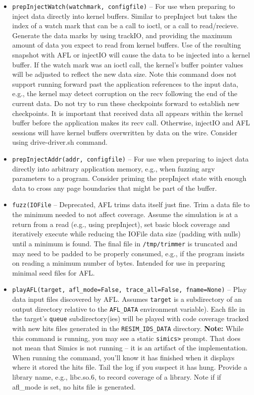 \documentclass[titlepage]{article}
\begin{document}
\begin{itemize}
\item{\tt prepInjectWatch(watchmark, configfile)} -- For use when preparing to inject data directly into kernel buffers.  
Similar to prepInject but takes the index of a watch 
mark that can be a call to ioctl, or a call to read/recieve. Generate the data marks by using trackIO, and providing the maximum amount of data you expect to 
read from kernel buffers.
Use of the resulting snapshot with AFL or injectIO will cause the data to be injected
into a kernel buffer. If the watch mark was an ioctl call, the kernel's buffer pointer values will be adjusted to reflect the new data size.  Note this command does not support running forward past the application
references to the input data, e.g., the kernel may detect corruption on the recv following the end of the current data.
Do not try to run these checkpoints forward to establish new checkpoints.
It is important that received data all appears within the kernel buffer before the application makes its recv call.  Otherwise, injectIO and AFL sessions
will have kernel buffers overwritten by data on the wire.  Consider using drive-driver.sh command.

\item{\tt prepInjectAddr(addr, configfile)} -- For use when preparing to inject data directly into arbitrary application memory, e.g., when fuzzing argv parameters
to a program.  Consider priming the prepInject state with enough data to cross any page boundaries that might be part of the buffer.

\item{\tt fuzz(IOFile} -- Deprecated, AFL trims data itself just fine.  Trim a data file to the minimum needed to not affect coverage. Assume the simulation is at 
a return from a read (e.g., using prepInject), set basic block coverage and iteratively execute while reducing the
IOFile data size (padding with nulls) until a minimum is found.  The final file in {\tt /tmp/trimmer} is truncated and may need to be padded to be properly consumed, e.g.,
if the program insists on reading a minimum number of bytes.  Intended for use in preparing minimal seed files for AFL.

\item{\tt playAFL(target, afl\_mode=False, trace\_all=False, fname=None)} -- Play data input files discovered by AFL.  Assumes {\tt target} is a subdirectory of an output directory relative to the {\tt AFL\_DATA} environment variable).  
Each file in the target's {\tt queue} subdirectory(ies) will be played with code coverage tracked with new hits files generated in the {\tt RESIM\_IDS\_DATA} directory.
\textbf{Note:} While this command is running, you may see a static {\tt simics>} prompt.  That does not mean that Simics is not running -- it is an artifact of the implementation.  When running the command, you'll know it has finished when it displays where it stored the hits file.
Tail the log if you suspect it has hung.  Provide a library name, e.g., libc.so.6, to record coverage of a library.  Note if if afl\_mode is set, no hits file is generated.


\end{itemize}
\end{document}
